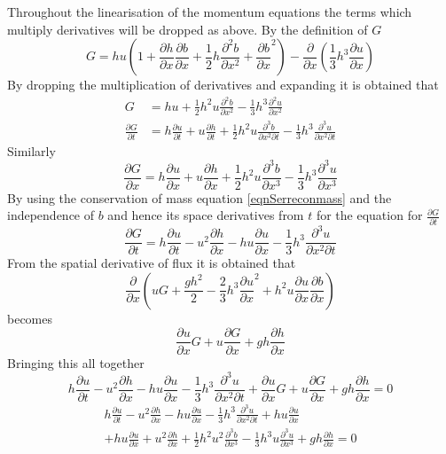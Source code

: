 \documentclass[12pt]{article}
\begin{document}
Throughout the linearisation of the momentum equations the terms which multiply derivatives will be dropped as above. By the definition of $G$ 
%
\[ G =  h {u} \left(1 + \frac{\partial h}{\partial x}\frac{\partial b}{\partial x} + \frac{1}{2}h\frac{\partial^2 b}{\partial x^2} + \frac{\partial b}{\partial x}^2 \right) - \frac{\partial}{\partial x}\left(\frac{1}{3}h^3  \frac{\partial {u}}{\partial x}\right)\]
%
By dropping the multiplication of derivatives and expanding it is obtained that
%
\begin{align*}
G &=  h {u} + \frac{1}{2}h^2 {u}\frac{\partial^2 b}{\partial x^2} - \frac{1}{3}h^3  \frac{\partial^2 {u}}{\partial x^2} \\
\frac{\partial G}{\partial t} &= h\frac{\partial {u}}{\partial t} + {u}\frac{\partial h}{\partial t}  + \frac{1}{2}h^2 {u}\frac{\partial^3 b}{\partial x^2 \partial t} - \frac{1}{3}h^3  \frac{\partial^3 {u}}{\partial x^2 \partial t}
\end{align*}
%
Similarly 
%
\[\frac{\partial G}{\partial x} = h\frac{\partial {u}}{\partial x} + {u}\frac{\partial h}{\partial x}  + \frac{1}{2}h^2 {u}\frac{\partial^3 b}{\partial x^3} - \frac{1}{3}h^3  \frac{\partial^3 {u}}{\partial x^3}\]
%
By using the conservation of mass equation \eqref{eqnSerreconmass} and the independence of $b$ and hence its space derivatives from $t$ for the equation for $\frac{\partial G}{\partial t}$
%
\[\frac{\partial G}{\partial t} = h\frac{\partial {u}}{\partial t}  -{u}^2\frac{\partial h}{\partial x} - h{u}\frac{\partial {u}}{\partial x}  - \frac{1}{3}h^3  \frac{\partial^3 {u}}{\partial x^2 \partial t}\]
%
From the spatial derivative of flux it is obtained that
%
\[\frac{\partial}{\partial x} \left({u} G + \frac{gh^2}{2} - \frac{2}{3}h^3 \frac{\partial {u}}{\partial x}^2 + h^2 {u}\frac{\partial {u}}{\partial x}\frac{\partial b}{\partial x} \right)\]
%
becomes
%
\[\frac{\partial {u}}{\partial x} G + {u}\frac{\partial G}{\partial x} + gh\frac{\partial h}{\partial x} \]
%
Bringing this all together
%
\[h\frac{\partial {u}}{\partial t}  -{u}^2\frac{\partial h}{\partial x} - h{u}\frac{\partial {u}}{\partial x}  - \frac{1}{3}h^3  \frac{\partial^3 {u}}{\partial x^2 \partial t} + \frac{\partial{u}}{\partial x} G + {u}\frac{\partial G}{\partial x} + gh\frac{\partial h}{\partial x} = 0\]
%
\begin{multline*}
h\frac{\partial {u}}{\partial t}  -{u}^2\frac{\partial h}{\partial x} - h{u}\frac{\partial {u}}{\partial x} - \frac{1}{3}h^3  \frac{\partial^3 {u}}{\partial x^2 \partial t} + hu\frac{\partial{u}}{\partial x} \\ +  h{u}\frac{\partial {u}}{\partial x} + {u}^2\frac{\partial h}{\partial x}  + \frac{1}{2}h^2 {u}^2\frac{\partial^3 b}{\partial x^3} - \frac{1}{3}h^3 {u}  \frac{\partial^3 {u}}{\partial x^3} + gh\frac{\partial h}{\partial x} = 0
\end{multline*}
\end{document}

